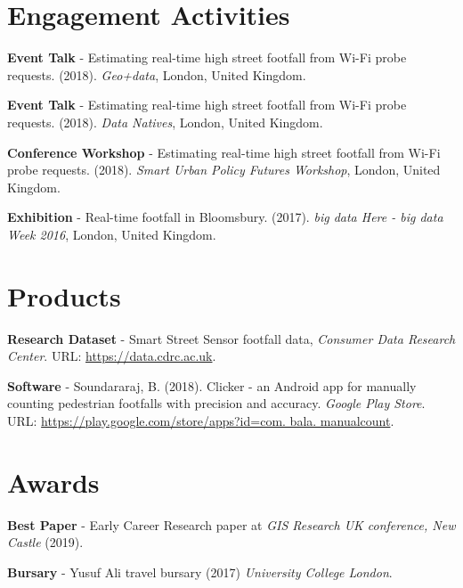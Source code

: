 \section*{Engagement Activities}
\vspace{0.2cm} \par \noindent \textbf{Event Talk} - Estimating real-time high street footfall from Wi-Fi probe requests. (2018). \textit{Geo+data}, London, United Kingdom.
\vspace{0.2cm} \par \noindent \textbf{Event Talk} - Estimating real-time high street footfall from Wi-Fi probe requests. (2018). \textit{Data Natives}, London, United Kingdom.
\vspace{0.2cm} \par \noindent \textbf{Conference Workshop} - Estimating real-time high street footfall from Wi-Fi probe requests. (2018). \textit{Smart Urban Policy Futures Workshop}, London, United Kingdom.
\vspace{0.2cm} \par \noindent \textbf{Exhibition} - Real-time footfall in Bloomsbury. (2017). \textit{big data Here - big data Week 2016}, London, United Kingdom.

\section*{Products}
\vspace{0.2cm} \par \noindent \textbf{Research Dataset} - Smart Street Sensor footfall data, \textit{Consumer Data Research Center}. URL: \url{https://data.cdrc.ac.uk}.
\vspace{0.2cm} \par \noindent \textbf{Software} - Soundararaj, B. (2018). Clicker - an Android app for manually counting pedestrian footfalls with precision and accuracy. \textit{Google Play Store}. URL: \url{https://play.google.com/store/apps?id=com. bala. manualcount}.

\section*{Awards}
\vspace{0.2cm} \par \noindent \textbf{Best Paper} - Early Career Research paper at \textit{GIS Research UK conference, New Castle} (2019).
\vspace{0.2cm} \par \noindent \textbf{Bursary} - Yusuf Ali travel bursary (2017) \textit{University College London}.


